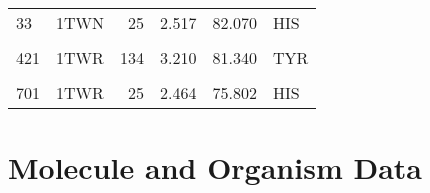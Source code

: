 \begin{table}
\begin{tabular}{llrrrl}
			33 & 1TWN & 25 & 2.517 & 82.070 & HIS\\
			\cellcolor{gray!6}{41} & \cellcolor{gray!6}{1TWR} & \cellcolor{gray!6}{114} & \cellcolor{gray!6}{11.476} & \cellcolor{gray!6}{76.363} & \cellcolor{gray!6}{TYR}\\
			421 & 1TWR & 134 & 3.210 & 81.340 & TYR\\
			\cellcolor{gray!6}{45} & \cellcolor{gray!6}{1TWR} & \cellcolor{gray!6}{137} & \cellcolor{gray!6}{7.391} & \cellcolor{gray!6}{78.764} & \cellcolor{gray!6}{TYR}\\
			701 & 1TWR & 25 & 2.464 & 75.802 & HIS\\
			\bottomrule
		\end{tabular}
	\end{table}

\section{Molecule and Organism Data}
